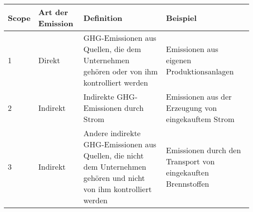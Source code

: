 \begin{tabular}{|p{1cm}|p{3cm}|p{5cm}|p{5cm}|}
    \hline
    \textbf{Scope} & \textbf{Art der Emission} & \textbf{Definition} & Beispiel\\ \hline \hline
    1 & Direkt & \ac{GHG}-Emissionen aus Quellen, die dem Unternehmen gehören oder von ihm kontrolliert werden &  Emissionen aus eigenen Produktionsanlagen\\ \hline
    2 & Indirekt & Indirekte \ac{GHG}-Emissionen durch Strom & Emissionen aus der Erzeugung von eingekauftem Strom \\ \hline
    3 & Indirekt & Andere indirekte \ac{GHG}-Emissionen aus Quellen, die nicht dem Unternehmen gehören und nicht von ihm kontrolliert werden & Emissionen durch den Transport von eingekauften Brennstoffen \\ \hline
\end{tabular}
